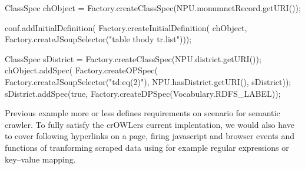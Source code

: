 \begtt
ClassSpec chObject = Factory.createClassSpec(NPU.monumnetRecord.getURI());

conf.addInitialDefinition(
       Factory.createInitialDefinition(
         chObject,
         Factory.createJSoupSelector("table tbody tr.list")));

ClassSpec sDistrict = Factory.createClassSpec(NPU.district.getURI());
chObject.addSpec(
           Factory.createOPSpec(
             Factory.createJSoupSelector("td:eq(2)"),
                                         NPU.hasDistrict.getURI(),
                                         sDistrict));
sDistrict.addSpec(true, Factory.createDPSpec(Vocabulary.RDFS_LABEL));
\endtt

Previous example more or less defines requirements on scenario for semantic
crawler. To fully satisfy the crOWLers current implentation, we would also have
to cover following hyperlinks on a page, firing javascript and browser events and
functions of tranforming scraped data using for example regular expressions or
key--value mapping. 

%


%
%
%
%


